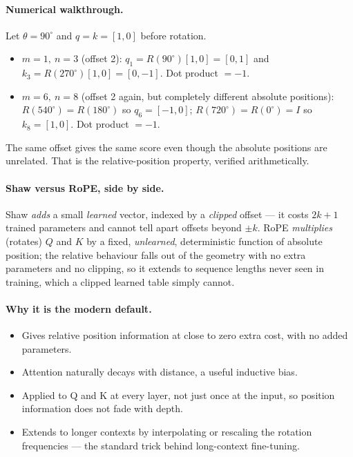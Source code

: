 \documentclass[11pt,a4paper]{article}
\begin{document}
\paragraph{Numerical walkthrough.} Let $\theta = 90^\circ$ and $q = k = [1, 0]$ before
rotation.
\begin{itemize}
\item $m = 1,\ n = 3$ (offset 2): $q_1 = R(90^\circ)[1,0] = [0,1]$ and
  $k_3 = R(270^\circ)[1,0] = [0,-1]$. Dot product $= -1$.
\item $m = 6,\ n = 8$ (offset 2 again, but completely different absolute positions):
  $R(540^\circ) = R(180^\circ)$ so $q_6 = [-1, 0]$; $R(720^\circ) = R(0^\circ) = I$ so
  $k_8 = [1, 0]$. Dot product $= -1$.
\end{itemize}
The same offset gives the same score even though the absolute positions are unrelated. That is
the relative-position property, verified arithmetically.

\paragraph{Shaw versus RoPE, side by side.} Shaw \emph{adds} a small \emph{learned} vector,
indexed by a \emph{clipped} offset --- it costs $2k+1$ trained parameters and cannot tell
apart offsets beyond $\pm k$. RoPE \emph{multiplies} (rotates) $Q$ and $K$ by a fixed,
\emph{unlearned}, deterministic function of absolute position; the relative behaviour falls
out of the geometry with no extra parameters and no clipping, so it extends to sequence
lengths never seen in training, which a clipped learned table simply cannot.

\paragraph{Why it is the modern default.}
\begin{itemize}
\item Gives relative position information at close to zero extra cost, with no added
  parameters.
\item Attention naturally decays with distance, a useful inductive bias.
\item Applied to Q and K at every layer, not just once at the input, so position information
  does not fade with depth.
\item Extends to longer contexts by interpolating or rescaling the rotation frequencies ---
  the standard trick behind long-context fine-tuning.
\end{itemize}
\end{document}
